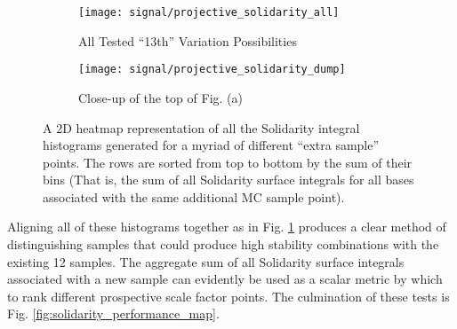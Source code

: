     \begin{figure}[tbh]
        \begin{subfigure}{0.5\textwidth}
            \texttt{[image: signal/projective\_solidarity\_all]}
            \captionsetup{justification=centering} \caption{All Tested ``13th'' Variation Possibilities}
        \end{subfigure}
        \begin{subfigure}{0.5\textwidth}
            \texttt{[image: signal/projective\_solidarity\_dump]}
            \captionsetup{justification=centering} \caption{Close-up of the top of Fig. (a)}
        \end{subfigure}
        \caption{
            A 2D heatmap representation of all the Solidarity integral histograms generated for a myriad of different ``extra sample'' points.
            The rows are sorted from top to bottom by the sum of their bins
                (That is, the sum of all Solidarity surface integrals for all bases associated with the same additional MC sample point).
        }
        \label{fig:solidarity_dump}
    \end{figure}
    \FloatBarrier

    Aligning all of these histograms together as in Fig. \ref{fig:solidarity_dump}
        produces a clear method of distinguishing samples that 
        could produce high stability combinations with the existing 12 samples.
    The aggregate sum of all Solidarity surface integrals associated with a new sample
        can evidently be used as a scalar metric by which to rank different prospective scale factor points.
    The culmination of these tests is Fig. \ref{fig:solidarity_performance_map}.

